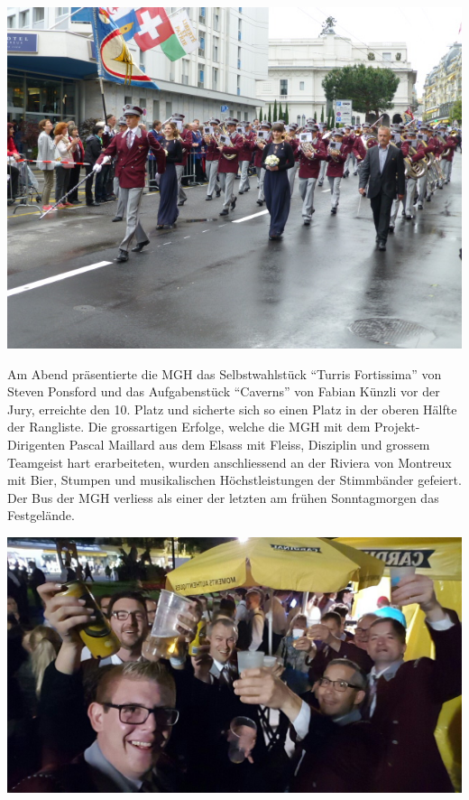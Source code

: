 \begin{history}
    \begin{MulticolFigure}
        \centering
        \includegraphics[width=0.93\linewidth]{./chap/2001-2024/2016/Marsch-Montreux-2016.jpg}
    \end{MulticolFigure}

    Am Abend präsentierte die MGH das Selbstwahlstück \enquote{Turris
        Fortissima} von Steven Ponsford und das Aufgabenstück \enquote{Caverns}
    von Fabian Künzli vor der Jury, erreichte den 10. Platz und sicherte
    sich so einen Platz in der oberen Hälfte der Rangliste. Die grossartigen
    Erfolge, welche die MGH mit dem Projekt-Dirigenten Pascal Maillard aus
    dem Elsass mit Fleiss, Disziplin und grossem Teamgeist hart
    erarbeiteten, wurden anschliessend an der Riviera von Montreux mit Bier,
    Stumpen und musikalischen Höchstleistungen der Stimmbänder gefeiert. Der
    Bus der MGH verliess als einer der letzten am frühen Sonntagmorgen das
    Festgelände.

    \begin{MulticolFigure}
        \centering
        \includegraphics[width=0.93\linewidth]{./chap/2001-2024/2016/Feiern.jpg}
    \end{MulticolFigure}


\end{history}
